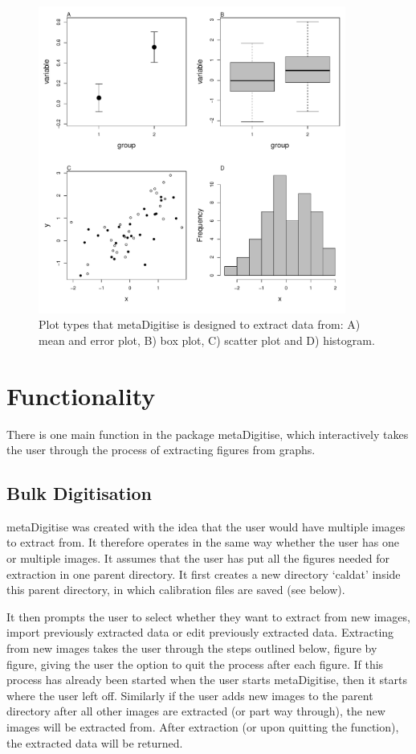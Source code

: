 \documentclass{article}
\begin{document}
\begin{figure}[ht] 
 \includegraphics[width=0.9\textwidth]{fig_plot_type.pdf} 
 \caption{Plot types that metaDigitise is designed to extract data from: A) mean and error plot, B) box plot, C) scatter plot and D) histogram. }
\label{fig:plot_type}
\end{figure}

\section{Functionality}
There is one main function in the package metaDigitise, which interactively takes the user through the process of extracting figures from graphs.

\subsection{Bulk Digitisation}
metaDigitise was created with the idea that the user would have multiple images to extract from. It therefore operates in the same way whether the user has one or multiple images. It assumes that the user has put all the figures needed for extraction in one parent directory. It first creates a new directory `caldat' inside this parent directory, in which calibration files are saved (see below). 

It then prompts the user to select whether they want to extract from new images, import previously extracted data or edit previously extracted data. Extracting from new images takes the user through the steps outlined below, figure by figure, giving the user the option to quit the process after each figure. If this process has already been started when the user starts metaDigitise, then it starts where the user left off. Similarly if the user adds new images to the parent directory after all other images are extracted (or part way through), the new images will be extracted from. After extraction (or upon quitting the function), the extracted data will be returned. %
\end{document}
